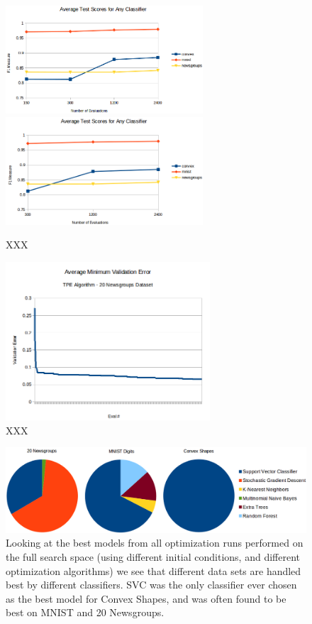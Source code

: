 \documentclass[wcp]{jmlr}
\begin{document}
\begin{figure}
    \centering
    \includegraphics[width=2.9in]{graphics/scores_by_classifier}
    \includegraphics[width=2.9in]{graphics/scores_per_eval}
    \caption{
	    XXX
    }
    \label{fig:per_clf}
\end{figure}

\begin{figure}
    \centering
    \includegraphics[width=3in]{graphics/AvgMinValidErrorTPE}
    \caption{
	    XXX
    }
    \label{fig:errtpe}
\end{figure}

\begin{figure}
    \centering
    \includegraphics[width=\textwidth]{graphics/pie}
    \caption{Looking at the best models from all optimization runs performed on the full search space (using different initial conditions, and different optimization algorithms)
             we see that different data sets are handled best by different classifiers.
             SVC was the only classifier ever chosen as the best model for Convex Shapes, and was often found to be best on MNIST and 20 Newsgroups.
         }
    \label{fig:npie}
\end{figure}
\end{document}
